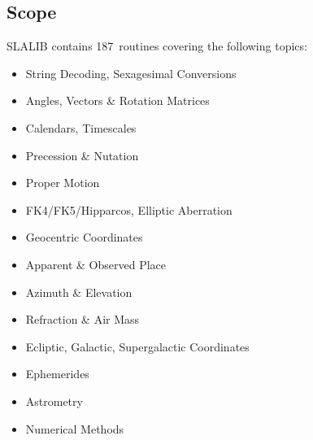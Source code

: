 \documentclass[11pt,twoside]{article}
\newcommand{\nroutines} {187}
\begin{document}
\subsection{Scope}
SLALIB contains \nroutines\ routines covering the following topics:
\begin{itemize}
\item String Decoding,
      Sexagesimal Conversions
\item Angles, Vectors \& Rotation Matrices
\item Calendars,
      Timescales
\item Precession \& Nutation
\item Proper Motion
\item FK4/FK5/Hipparcos,
      Elliptic Aberration
\item Geocentric Coordinates
\item Apparent \& Observed Place
\item Azimuth \& Elevation
\item Refraction \& Air Mass
\item Ecliptic,
      Galactic,
      Supergalactic Coordinates
\item Ephemerides
\item Astrometry
\item Numerical Methods
\end{itemize}
\end{document}
